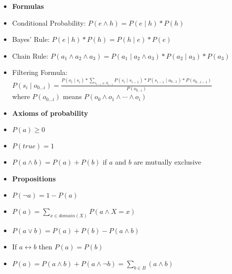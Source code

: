 \documentclass[11pt,landscape]{memoir}
\begin{document}
\begin{multicols}{2}

\begin{itemize}
    \item \textbf{Formulas}
    \item Conditional Probability: $P(e \land h) = P(e \mid h) * P(h)$
    \item Bayes' Rule: $P(e \mid h) * P(h) = P(h \mid e) * P(e)$
    \item Chain Rule: $P(a_1 \land a_2 \land a_3) = P(a_1 \mid a_2 \land a_3) * P(a_2 \mid a_3) * P(a_3)$
    \item Filtering Formula: $P(s_i \mid o_{0 \ldots i}) = \frac{P(o_i \mid s_i) * \sum_{s_{i-1} \in S_{i-1}} P(s_i \mid s_{i-1}) * P(s_{i-1} \mid o_{0 \ldots 1}) * P(o_{0 \ldots i-1})}{P(o_{0 \ldots i})}$ \\
        where $P(o_{0 \ldots i})$ means $P(o_0 \land o_1 \land \cdots \land o_i)$
\end{itemize}

\begin{itemize}
    \item \textbf{Axioms of probability}
    \item $P(a) \ge 0$
    \item $P(true) = 1$
    \item $P(a \land b) = P(a) + P(b)$ if $a$ and $b$ are mutually exclusive
\end{itemize}

\begin{itemize}
    \item \textbf{Propositions}
    \item $P(\lnot a) = 1 - P(a)$
    \item $P(a) = \sum_{x \in domain(X)} P(a \land X = x)$
    \item $P(a \lor b) = P(a) + P(b) - P(a \land b)$
    \item If $a \leftrightarrow b$ then $P(a) = P(b)$
    \item $P(a) = P(a \land b) + P(a \land \lnot b) = \sum_{b \in B}(a \land b)$
\end{itemize}


\end{multicols}
\end{document}
